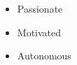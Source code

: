 \twocolumnsection
{
\begin{skills}
\end{skills}}
{
\vspace{1em}
\begin{itemize}
	\item Passionate
	\item Motivated 
    \item Autonomous
\end{itemize}
}
